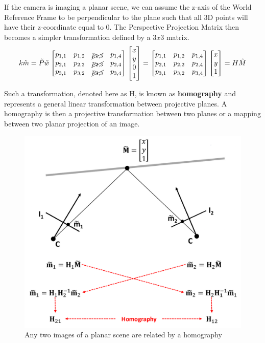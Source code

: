 If the camera is imaging a planar scene, we can assume the z-axis of the World Reference Frame to be perpendicular to the plane such that all 3D points will have their z-coordinate equal to 0.
The Perspective Projection Matrix then becomes a simpler transformation defined by a $3x3$ matrix.
$$k\tilde{m} = \tilde{P}\tilde{w}
\begin{bmatrix}
  p_{1,1} & p_{1,2} & \cancel{p_{1,3}} & p_{1,4} \\
  p_{2,1} & p_{2,2} & \cancel{p_{2,3}} & p_{2,4} \\
  p_{3,1} & p_{3,2} & \cancel{p_{3,3}} & p_{3,4} 
\end{bmatrix}
\begin{bmatrix}
x \\ y \\ 0 \\ 1
\end{bmatrix}
=
\begin{bmatrix}
  p_{1,1} & p_{1,2} & p_{1,4} \\
  p_{2,1} & p_{2,2} & p_{2,4} \\
  p_{3,1} & p_{3,2} & p_{3,4} 
\end{bmatrix}
\begin{bmatrix}
x \\ y \\ 1
\end{bmatrix}
= H\tilde{M}
$$

Such a transformation, denoted here as H, is known as \textbf{homography} and represents a general linear transformation between projective planes.
A homography is then a projective transformation between two planes or a mapping between two planar projection of an image.

\begin{figure}[htbp]
  \centering
  \includegraphics[width=0.6\linewidth]{./img/homography.jpg}
  \caption{Any two images of a planar scene are related by a homography}
  \label{fig:homography}
\end{figure}

